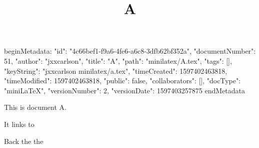 beginMetadata:
{
    "id": "4c66bef1-f9a6-4fe6-a6c8-3dfb62bf352a",
    "documentNumber": 51,
    "author": "jxxcarlson",
    "title": "A",
    "path": "minilatex/A.tex",
    "tags": [],
    "keyString": "jxxcarlson minilatex/a.tex",
    "timeCreated": 1597402463818,
    "timeModified": 1597402463818,
    "public": false,
    "collaborators": [],
    "docType": "miniLaTeX",
    "versionNumber": 2,
    "versionDate": 1597403257875
}
endMetadata

\title{A}

\maketitle

This is document A.

It links to 

Back the the 
